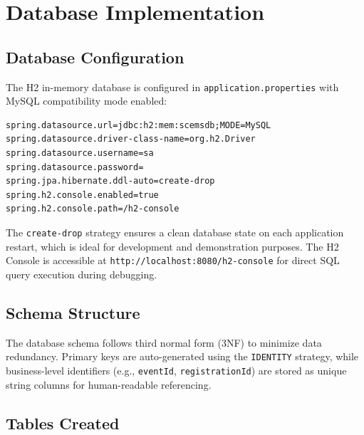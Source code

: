 \section{Database Implementation}

\subsection{Database Configuration}
The H2 in-memory database is configured in \texttt{application.properties} with MySQL compatibility mode enabled:

\begin{lstlisting}[caption={Database Configuration (application.properties)}]
spring.datasource.url=jdbc:h2:mem:scemsdb;MODE=MySQL
spring.datasource.driver-class-name=org.h2.Driver
spring.datasource.username=sa
spring.datasource.password=
spring.jpa.hibernate.ddl-auto=create-drop
spring.h2.console.enabled=true
spring.h2.console.path=/h2-console
\end{lstlisting}

The \texttt{create-drop} strategy ensures a clean database state on each application restart, which is ideal for development and demonstration purposes. The H2 Console is accessible at \texttt{http://localhost:8080/h2-console} for direct SQL query execution during debugging.

\subsection{Schema Structure}
The database schema follows third normal form (3NF) to minimize data redundancy. Primary keys are auto-generated using the \texttt{IDENTITY} strategy, while business-level identifiers (e.g., \texttt{eventId}, \texttt{registrationId}) are stored as unique string columns for human-readable referencing.

\subsection{Tables Created}

